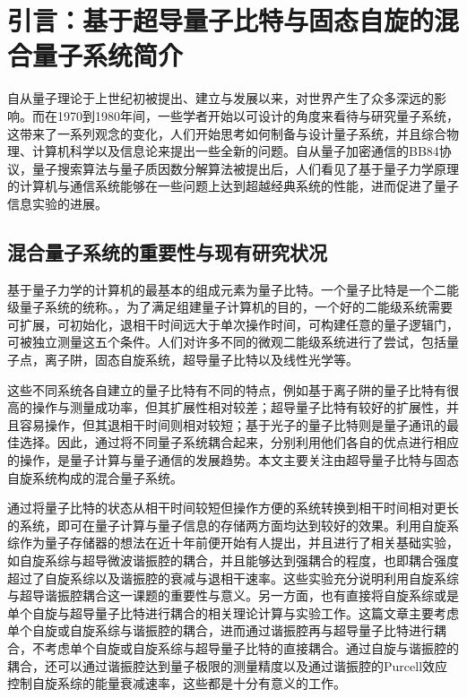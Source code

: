 \chapter{引言：基于超导量子比特与固态自旋的混合量子系统简介}
\label{cha:intro}




        自从量子理论于上世纪初被提出、建立与发展以来，对世界产生了众多深远的影响。而在1970到1980年间，一些学者开始以可设计的角度来看待与研究量子系统\cite{feynman1982simulating}，这带来了一系列观念的变化，人们开始思考如何制备与设计量子系统，并且综合物理、计算机科学以及信息论来提出一些全新的问题。\cite{nielsen2002quantum}自从量子加密通信的BB84协议\cite{bennett1984quantum}，量子搜索算法\cite{grover1996fast}与量子质因数分解算法\cite{shor1994algorithms}被提出后，人们看见了基于量子力学原理的计算机与通信系统能够在一些问题上达到超越经典系统的性能，进而促进了量子信息实验的进展。

        \section{混合量子系统的重要性与现有研究状况} %
        \label{sec:importance}

            基于量子力学的计算机的最基本的组成元素为量子比特。一个量子比特是一个二能级量子系统的统称。，为了满足组建量子计算机的目的，一个好的二能级系统需要可扩展，可初始化，退相干时间远大于单次操作时间，可构建任意的量子逻辑门，可被独立测量这五个条件\cite{divincenzo2000physical}。人们对许多不同的微观二能级系统进行了尝试，包括量子点\cite{loss1998quantum}，离子阱\cite{haffner2008quantum}，固态自旋系统\cite{gershenfeld1997bulk}，超导量子比特\cite{devoret2013superconducting}以及线性光学\cite{kok2007linear}等。

            这些不同系统各自建立的量子比特有不同的特点，例如基于离子阱的量子比特有很高的操作与测量成功率，但其扩展性相对较差；超导量子比特有较好的扩展性，并且容易操作，但其退相干时间则相对较短；基于光子的量子比特则是量子通讯的最佳选择。因此，通过将不同量子系统耦合起来，分别利用他们各自的优点进行相应的操作，是量子计算与量子通信的发展趋势。本文主要关注由超导量子比特与固态自旋系统构成的混合量子系统。


            通过将量子比特的状态从相干时间较短但操作方便的系统转换到相干时间相对更长的系统，即可在量子计算与量子信息的存储两方面均达到较好的效果。利用自旋系综作为量子存储器的想法在近十年前便开始有人提出\cite{Dutt2007,Imamoglu2009,Wesenberg2009}，并且进行了相关基础实验，如自旋系综与超导微波谐振腔的耦合\cite{Schuster2010}，并且能够达到强耦合的程度\cite{kubo2010}，也即耦合强度超过了自旋系综以及谐振腔的衰减与退相干速率。这些实验充分说明利用自旋系综与超导谐振腔耦合这一课题的重要性与意义。另一方面，也有直接将自旋系综或是单个自旋与超导量子比特进行耦合的相关理论计算\cite{Marcos2010}与实验工作\cite{Zhu2011,Mark2013}。这篇文章主要考虑单个自旋或自旋系综与谐振腔的耦合，进而通过谐振腔再与超导量子比特进行耦合，不考虑单个自旋或自旋系综与超导量子比特的直接耦合。通过自旋与谐振腔的耦合，还可以通过谐振腔达到量子极限的测量精度\cite{Bienfait2016a}以及通过谐振腔的Purcell效应控制自旋系综的能量衰减速率\cite{Bienfait2016b}，这些都是十分有意义的工作。

